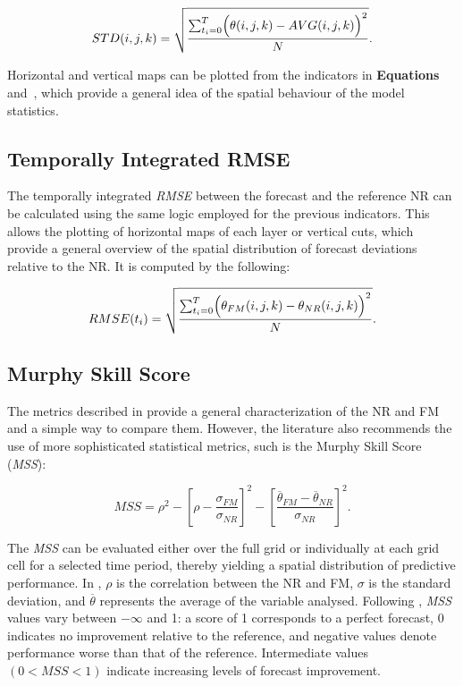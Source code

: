 \begin{equation}\label{eq:cp2_stdt}
    STD(i,j,k) = \sqrt{\frac{\sum_{t_i=0}^{T} \Bigl( \theta(i,j,k) - AVG(i,j,k) \Bigr)^2}{N}}.
\end{equation}

Horizontal and vertical maps can be plotted from the indicators in \textbf{Equations}~ and~, which provide a general idea of the spatial behaviour of the model statistics.

\subsection{Temporally Integrated RMSE}
The temporally integrated \textit{RMSE} between the forecast and the reference NR can be calculated using the same logic employed for the previous indicators. This allows the plotting of horizontal maps of each layer or vertical cuts, which provide a general overview of the spatial distribution of forecast deviations relative to the NR. It is computed by the following:

\begin{equation}\label{eq:cp2_rmset}
    RMSE(t_i) = \sqrt{\frac{\sum_{t_i=0}^{T} \Bigl( \theta_{FM}(i,j,k) - \theta_{NR}(i,j,k) \Bigr)^2}{N}}.
\end{equation}

\subsection{Murphy Skill Score}
The metrics described in  provide a general characterization of the NR and FM and a simple way to compare them. However, the literature also recommends the use of more sophisticated statistical metrics, such is the Murphy Skill Score (\textit{MSS}):

\begin{equation}\label{eq:cp2_murphyss}
    MSS = \rho^2 - \left[ \rho - \frac{\sigma_{FM}}{\sigma_{NR}} \right]^2 - \left[ \frac{\overline \theta_{FM}-\overline \theta_{NR}}{\sigma_{NR}} \right]^2.
\end{equation}

The \textit{MSS} can be evaluated either over the full grid or individually at each grid cell for a selected time period, thereby yielding a spatial distribution of predictive performance. In , $\rho$ is the correlation between the NR and FM, $\sigma$ is the standard deviation, and $\overline{\theta}$ represents the average of the variable analysed. Following \textcite{murphy1988skill}, \textit{MSS} values vary between $-\infty$ and 1: a score of 1 corresponds to a perfect forecast, 0 indicates no improvement relative to the reference, and negative values denote performance worse than that of the reference. Intermediate values $(0 < MSS < 1)$ indicate increasing levels of forecast improvement.

